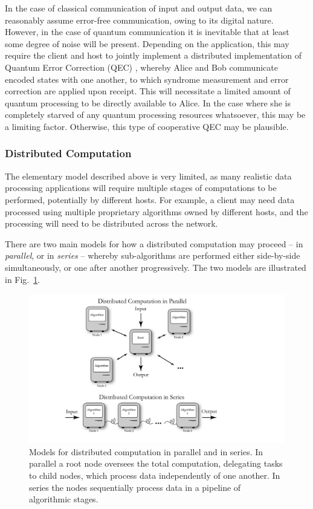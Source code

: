 \documentclass[aps,rmp,twocolumn,amsmath,amssymb,nofootinbib,superscriptaddress]{revtex4}
\begin{document}
In the case of classical communication of input and output data, we can reasonably assume error-free communication, owing to its digital nature. However, in the case of quantum communication it is inevitable that at least some degree of noise will be present. Depending on the application, this may require the client and host to jointly implement a distributed implementation of Quantum Error Correction (QEC) \cite{bib:Shor95, bib:CalderbankShor96, bib:NielsenChuang00}, whereby Alice and Bob communicate encoded states with one another, to which syndrome measurement and error correction are applied upon receipt. This will necessitate a limited amount of quantum processing to be directly available to Alice. In the case where she is completely starved of any quantum processing resources whatsoever, this may be a limiting factor. Otherwise, this type of cooperative QEC may be plausible.

%
%

\subsubsection{Distributed Computation} \label{sec:dist_QC}

The elementary model described above is very limited, as many realistic data processing applications will require multiple stages of computations to be performed, potentially by different hosts. For example, a client may need data processed using multiple proprietary algorithms owned by different hosts, and the processing will need to be distributed across the network.

There are two main models for how a distributed computation may proceed -- in \emph{parallel}, or in \emph{series} -- whereby sub-algorithms are performed either side-by-side simultaneously, or one after another progressively. The two models are illustrated in Fig.~\ref{fig:distributed}.

\begin{figure}[!htb]
\includegraphics[width=\columnwidth]{distributed}
\caption{Models for distributed computation in parallel and in series. In parallel a root node oversees the total computation, delegating tasks to child nodes, which process data independently of one another. In series the nodes sequentially process data in a pipeline of algorithmic stages.} \label{fig:distributed}
\end{figure}
\end{document}
